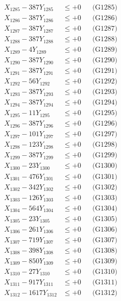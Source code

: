 \documentclass[a4paper,10pt]{article}
\begin{document}
{\begin{align}
X_{1285} - 387Y_{1285} &\leq +0 && \text{(G1285)} \\
X_{1286} - 387Y_{1286} &\leq +0 && \text{(G1286)} \\
X_{1287} - 387Y_{1287} &\leq +0 && \text{(G1287)} \\
X_{1288} - 387Y_{1288} &\leq +0 && \text{(G1288)} \\
X_{1289} - 4Y_{1289} &\leq +0 && \text{(G1289)} \\
X_{1290} - 387Y_{1290} &\leq +0 && \text{(G1290)} \\
\allowbreak
X_{1291} - 387Y_{1291} &\leq +0 && \text{(G1291)} \\
X_{1292} - 56Y_{1292} &\leq +0 && \text{(G1292)} \\
X_{1293} - 387Y_{1293} &\leq +0 && \text{(G1293)} \\
X_{1294} - 387Y_{1294} &\leq +0 && \text{(G1294)} \\
X_{1295} - 11Y_{1295} &\leq +0 && \text{(G1295)} \\
X_{1296} - 387Y_{1296} &\leq +0 && \text{(G1296)} \\
X_{1297} - 101Y_{1297} &\leq +0 && \text{(G1297)} \\
X_{1298} - 123Y_{1298} &\leq +0 && \text{(G1298)} \\
X_{1299} - 387Y_{1299} &\leq +0 && \text{(G1299)} \\
X_{1300} - 23Y_{1300} &\leq +0 && \text{(G1300)} \\
\allowbreak
X_{1301} - 476Y_{1301} &\leq +0 && \text{(G1301)} \\
X_{1302} - 342Y_{1302} &\leq +0 && \text{(G1302)} \\
X_{1303} - 126Y_{1303} &\leq +0 && \text{(G1303)} \\
X_{1304} - 564Y_{1304} &\leq +0 && \text{(G1304)} \\
X_{1305} - 23Y_{1305} &\leq +0 && \text{(G1305)} \\
X_{1306} - 261Y_{1306} &\leq +0 && \text{(G1306)} \\
X_{1307} - 719Y_{1307} &\leq +0 && \text{(G1307)} \\
X_{1308} - 398Y_{1308} &\leq +0 && \text{(G1308)} \\
X_{1309} - 850Y_{1309} &\leq +0 && \text{(G1309)} \\
X_{1310} - 27Y_{1310} &\leq +0 && \text{(G1310)} \\
\allowbreak
X_{1311} - 917Y_{1311} &\leq +0 && \text{(G1311)} \\
X_{1312} - 1617Y_{1312} &\leq +0 && \text{(G1312)} \\

\end{align}}
\end{document}
